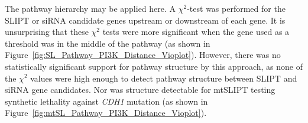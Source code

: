 


\begin{table*}[!htbp]
\caption{\gls{ANOVA} for Synthetic Lethality and PI3K Hierarchy}
\label{tab:SL_Pathway_PI3K_Distance_Counts}
\noindent{}
\end{table*}
The pathway hierarchy may be applied here. A $\chi^2$-test was performed for the \gls{SLIPT} or \gls{siRNA} candidate genes upstream or downstream of each gene. It is unsurprising that these $\chi^2$ tests were more significant when the gene used as a threshold was in the middle of the pathway (as shown in Figure~\ref{fig:SL_Pathway_PI3K_Distance_Vioplot}). However, there was no statistically significant support for pathway structure by this approach, as none of the $\chi^2$ values were high enough to detect pathway structure between \gls{SLIPT} and \gls{siRNA} gene candidates. Nor was structure detectable for mtSLIPT testing synthetic lethality against \textit{CDH1} mutation (as shown in Figure~\ref{fig:mtSL_Pathway_PI3K_Distance_Vioplot}).


